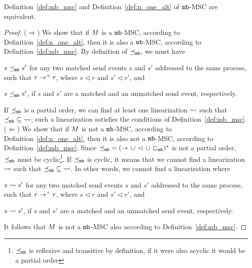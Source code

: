 \begin{proposition}
    Definition~\ref{def:mb_msc} and Definition~\ref{def:n_one_alt} of $\mathtt{mb}$-MSC are equivalent.
\end{proposition}
\begin{proof}
    ($\Rightarrow$)  We show that if $M$ is a $\mathtt{mb}$-MSC, according to Definition~\ref{def:n_one_alt}, then it is also a $\mathtt{mb}$-MSC, according to Definition~\ref{def:mb_msc}. By definition of $\preceq_{\mathtt{mb}}$, we must have 
    \begin{enumerate*}[label={(\roman*)}]
        \item $s \preceq_{\mathtt{mb}} s'$ for any two matched send events $s$ and $s'$ addressed to the same process, such that $r \to^+ r$, where $s \lhd r$ and $s' \lhd r'$, and
        \item $s \preceq_{\mathtt{mb}} s'$, if $s$ and $s'$ are a matched and an unmatched send event, respectively.
    \end{enumerate*} 
    If $\preceq_{\mathtt{mb}}$ is a partial order, we can find at least one linearization $\rightsquigarrow$ such that $\preceq_{\mathtt{mb}} \;\subseteq\; \rightsquigarrow$; such a linearization satisfies the conditions of Definition~\ref{def:mb_msc}.\newline
    ($\Leftarrow$) We show that if $M$ is not a $\mathtt{mb}$-MSC, according to Definition~\ref{def:n_one_alt}, then it is also not a $\mathtt{mb}$-MSC, according to Definition~\ref{def:mb_msc}. Since ${\preceq_{\mathtt{mb}}} = ({\to} \,\cup\, {\lhd} \,\cup\, {\sqsubset_{\mathtt{mb}}})^\ast$ is not a partial order, $\preceq_{\mathtt{mb}}$ must be cyclic\footnote{$\preceq_{\mathtt{mb}}$ is reflexive and transitive by definition, if it were also acyclic it would be a partial order}. If $\preceq_{\mathtt{mb}}$ is cyclic, it means that we cannot find a linearization $\rightsquigarrow$ such that $\preceq_{\mathtt{mb}} \;\subseteq\; \rightsquigarrow$. In other words, we cannot find a linearization where      
    \begin{enumerate*}[label={(\roman*)}]
        \item $s \rightsquigarrow s'$ for any two matched send events $s$ and $s'$ addressed to the same process, such that $r \to^+ r$, where $s \lhd r$ and $s' \lhd r'$, and
        \item $s \rightsquigarrow s'$, if $s$ and $s'$ are a matched and an unmatched send event, respectively.
    \end{enumerate*} 
    It follows that $M$ is not a $\mathtt{mb}$-MSC also according to Definition~\ref{def:mb_msc}.
\end{proof}

